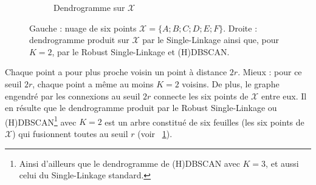 \begin{figure}[htbp]
\begin{subfigure}[b]{0.48\textwidth}
        \caption{Dendrogramme sur $\mathcal X$}
        \label{fig:dendrogramme}
    \end{subfigure}
    
    \caption{Gauche : nuage de six points $\mathcal X = \bigl\{A ; B ; C ; D ; E ; F\bigr\}$. Droite : dendrogramme produit sur $\mathcal X$ par le Single-Linkage ainsi que, pour $K=2$, par le Robust Single-Linkage et (H)DBSCAN.}
    \label{fig:clustering}
\end{figure}

Chaque point a pour plus proche voisin un point à distance $2r$. Mieux : pour ce seuil $2r$, chaque point a même au moins $K=2$ voisins. De plus, le graphe engendré par les connexions au seuil $2r$ connecte les six points de $\mathcal X$ entre eux. Il en résulte que le dendrogramme produit par le Robust Single-Linkage ou (H)DBSCAN\footnote{Ainsi d'ailleurs que le dendrogramme de (H)DBSCAN avec $K=3$, et aussi celui du Single-Linkage standard.} avec $K=2$ est un arbre constitué de six feuilles (les six points de $\mathcal X$) qui fusionnent toutes au seuil $r$ (voir \Fig~\ref{fig:dendrogramme}).

